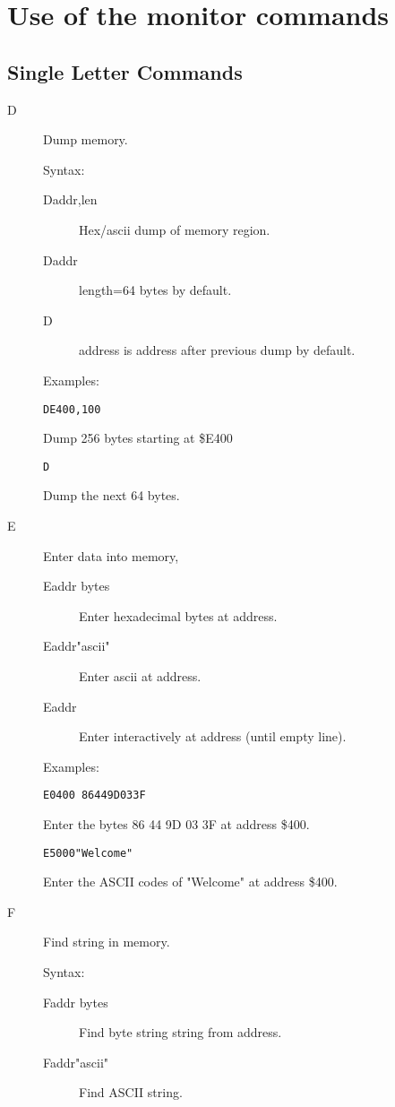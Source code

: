 \section{Use of the monitor commands}


\subsection{Single Letter Commands}

\begin{description}
\item[D] Dump memory.

Syntax:
\begin{description}
\item[Daddr,len]  Hex/ascii dump of memory region.
\item[Daddr]      length=64 bytes by default.
\item[D]          address is address after previous dump by default.
\end{description}

Examples:
\begin{verbatim}
DE400,100
\end{verbatim}
Dump 256 bytes starting at \$E400
\begin{verbatim}
D
\end{verbatim}
Dump the next 64 bytes.

\item[E] Enter data into memory,

\begin{description}
\item[Eaddr bytes] Enter hexadecimal bytes at address.
\item[Eaddr"ascii"] Enter ascii at address.
\item[Eaddr]      Enter interactively at address (until empty line).
\end{description}

Examples:
\begin{verbatim}
E0400 86449D033F
\end{verbatim}
Enter the bytes 86 44 9D 03 3F at address \$400. 
\begin{verbatim}
E5000"Welcome"
\end{verbatim}
Enter the ASCII codes of "Welcome" at address \$400.

\item[F] Find string in memory.

Syntax:
\begin{description}
\item[Faddr bytes]   Find byte string string from address.
\item[Faddr"ascii"]  Find ASCII string.
\end{description}


\end{description}
